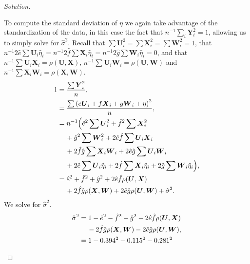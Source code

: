 \documentclass{amsart}
\newcommand{\bvec}[1]{{\boldsymbol #1}}
\begin{document}
\begin{proof}[Solution]
\begin{enumerate}[(a)]
						To compute the standard deviation of $\eta$ we again take advantage of the standardization of the data, in this case the fact that $n^{-1}\sum_{i} \bvec{Y}_{i}^{2} = 1$, allowing us to simply solve for $\hat{\sigma}^{2}$.
						Recall that $\sum\bvec{U}_{i}^{2} = \sum\bvec{X}_{i}^{2} = \sum\bvec{W}_{i}^{2} = 1$, that $n^{-1}2\hat{e}\sum\bvec{U}_{i}\hat{\eta}_{i} = n^{-1}2\hat{f}\sum\bvec{X}_{i}\hat{\eta}_{i} = n^{-1}2\hat{g}\sum\bvec{W}_{i}\hat{\eta}_{i} = 0$, and that $n^{-1}\sum \bvec{U}_{i}\bvec{X}_{i} = \rho(\bvec{U},\bvec{X})$, $n^{-1}\sum \bvec{U}_{i}\bvec{W}_{i} = \rho(\bvec{U},\bvec{W})$ and $n^{-1}\sum \bvec{X}_{i}\bvec{W}_{i} = \rho(\bvec{X},\bvec{W})$.
							\begin{align*}
								1 &= \frac{\sum \bvec{Y}_{i}^{2}}{n}, \\
								&= \frac{\sum\left( e \bvec{U}_{i} + f \bvec{X}_{i} + g \bvec{W}_{i} + \eta \right)^{2}}{n}, \\
								&= n^{-1}\Big( \hat{e}^{2}\sum\bvec{U}_{i}^{2} + \hat{f}^{2}\sum\bvec{X}_{i}^{2} \\ 
								&\hspace*{12pt} + \hat{g}^{2}\sum\bvec{W}_{i}^{2} + 2\hat{e}\hat{f}\sum\bvec{U}_{i}\bvec{X}_{i} \\
								&\hspace*{12pt} + 2\hat{f}\hat{g}\sum\bvec{X}_{i}\bvec{W}_{i} + 2\hat{e}\hat{g}\sum\bvec{U}_{i}\bvec{W}_{i} \\
								&\hspace*{12pt} + 2\hat{e}\sum\bvec{U}_{i}\hat{\eta}_{i} + 2\hat{f}\sum\bvec{X}_{i}\hat{\eta}_{i} + 2\hat{g}\sum\bvec{W}_{i}\hat{\eta}_{i} \Big), \\
								&= \hat{e}^{2} + \hat{f}^{2} + \hat{g}^{2} + 2\hat{e}\hat{f}\rho(\bvec{U},\bvec{X})	\\
								&\hspace*{12pt} + 2\hat{f}\hat{g}\rho(\bvec{X},\bvec{W}) + 2\hat{e}\hat{g}\rho(\bvec{U},\bvec{W}) + \hat{\sigma}^{2}.
							\end{align*}
						We solve for $\hat{\sigma}^{2}$.
							\begin{align*}
								\hat{\sigma}^{2} &= 1 - \hat{e}^{2} - \hat{f}^{2} - \hat{g}^{2} - 2\hat{e}\hat{f}\rho(\bvec{U},\bvec{X}) \\
								&\hspace*{12pt} - 2\hat{f}\hat{g}\rho(\bvec{X},\bvec{W}) - 2\hat{e}\hat{g}\rho(\bvec{U},\bvec{W}), \\
								&= 1 - 0.394^{2} - 0.115^{2} - 0.281^{2} \\

\end{align*}
\end{enumerate}
\end{proof}
\end{document}
